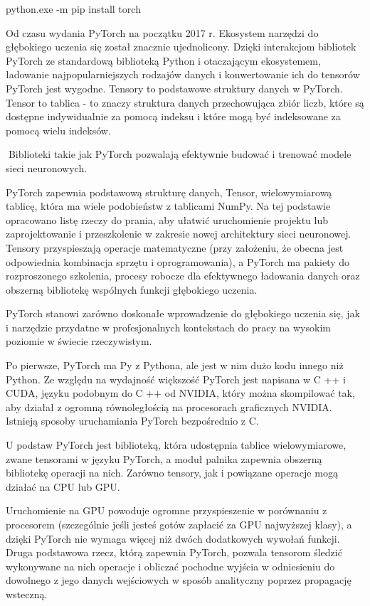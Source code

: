 \documentclass[brudnopis]{xmgr}
\begin{document}
python.exe -m pip install torch

Od czasu wydania PyTorch na początku 2017 r. Ekosystem narzędzi do głębokiego uczenia się został znacznie ujednolicony.
Dzięki interakcjom bibliotek PyTorch ze standardową biblioteką Python i otaczającym ekosystemem, ładowanie najpopularniejszych rodzajów danych i konwertowanie ich do tensorów PyTorch jest wygodne.
Tensory to podstawowe struktury danych w PyTorch. Tensor to tablica - to znaczy struktura danych przechowująca zbiór liczb, które są dostępne indywidualnie za pomocą indeksu i które mogą być indeksowane za pomocą wielu indeksów.

􏰹Biblioteki takie jak PyTorch pozwalają efektywnie budować i trenować modele sieci neuronowych.

PyTorch zapewnia podstawową strukturę danych, Tensor, wielowymiarową tablicę, która ma wiele podobieństw z tablicami NumPy. Na tej podstawie opracowano listę rzeczy do prania, aby ułatwić uruchomienie projektu lub zaprojektowanie i przeszkolenie w zakresie nowej architektury sieci neuronowej. Tensory przyspieszają operacje matematyczne (przy założeniu, że obecna jest odpowiednia kombinacja sprzętu i oprogramowania), a PyTorch ma pakiety do rozproszonego szkolenia, procesy robocze dla efektywnego ładowania danych oraz obszerną bibliotekę wspólnych funkcji głębokiego uczenia.

PyTorch stanowi zarówno doskonałe wprowadzenie do głębokiego uczenia się, jak i narzędzie przydatne w profesjonalnych kontekstach do pracy na wysokim poziomie w świecie rzeczywistym.

Po pierwsze, PyTorch ma Py z Pythona, ale jest w nim dużo kodu innego niż Python. 
Ze względu na wydajność większość PyTorch jest napisana w C ++ i CUDA, języku podobnym do C ++ od NVIDIA, który można skompilować tak, aby działał z ogromną równoległością na procesorach graficznych NVIDIA. Istnieją sposoby uruchamiania PyTorch bezpośrednio z C.

U podstaw PyTorch jest biblioteką, która udostępnia tablice wielowymiarowe, zwane tensorami w języku PyTorch, a moduł palnika zapewnia obszerną bibliotekę operacji na nich. Zarówno tensory, jak i powiązane operacje mogą działać na CPU lub GPU. 

Uruchomienie na GPU powoduje ogromne przyspieszenie w porównaniu z procesorem (szczególnie jeśli jesteś gotów zapłacić za GPU najwyższej klasy), a dzięki PyTorch nie wymaga więcej niż dwóch dodatkowych wywołań funkcji. Druga podstawowa rzecz, którą zapewnia PyTorch, pozwala tensorom śledzić wykonywane na nich operacje i obliczać pochodne wyjścia w odniesieniu do dowolnego z jego danych wejściowych w sposób analityczny poprzez propagację wsteczną. 
\end{document}
